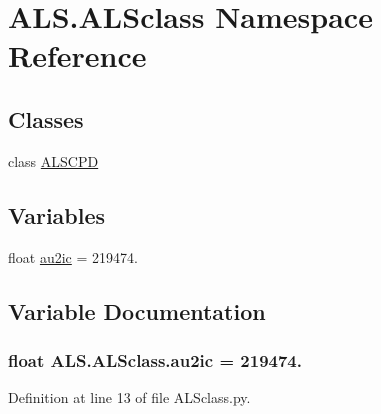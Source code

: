 \hypertarget{namespace_a_l_s_1_1_a_l_sclass}{\section{A\+L\+S.\+A\+L\+Sclass Namespace Reference}
\label{namespace_a_l_s_1_1_a_l_sclass}
}
\subsection*{Classes}
\begin{DoxyCompactItemize}
\item 
class \hyperlink{class_a_l_s_1_1_a_l_sclass_1_1_a_l_s_c_p_d}{A\+L\+S\+C\+P\+D}
\end{DoxyCompactItemize}
\subsection*{Variables}
\begin{DoxyCompactItemize}
\item 
float \hyperlink{namespace_a_l_s_1_1_a_l_sclass_a2843ad8c3b497572c7cc5bba0cb32193}{au2ic} = 219474.
\end{DoxyCompactItemize}


\subsection{Variable Documentation}
\hypertarget{namespace_a_l_s_1_1_a_l_sclass_a2843ad8c3b497572c7cc5bba0cb32193}{
\subsubsection[{au2ic}]{\setlength{\rightskip}{0pt plus 5cm}float A\+L\+S.\+A\+L\+Sclass.\+au2ic = 219474.}}\label{namespace_a_l_s_1_1_a_l_sclass_a2843ad8c3b497572c7cc5bba0cb32193}


Definition at line 13 of file A\+L\+Sclass.\+py.

